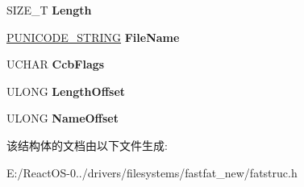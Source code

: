 \begin{DoxyCompactItemize}
S\+I\+Z\+E\+\_\+T {\bfseries Length}
\item 
\mbox{\label{struct___f_a_t___e_n_u_m___d_i_r_e_n_t___c_o_n_t_e_x_t_a7e00d42600eb7bd3980607776e92b93c}} 
\hyperlink{struct___u_n_i_c_o_d_e___s_t_r_i_n_g}{P\+U\+N\+I\+C\+O\+D\+E\+\_\+\+S\+T\+R\+I\+NG} {\bfseries File\+Name}
\item 
\mbox{\label{struct___f_a_t___e_n_u_m___d_i_r_e_n_t___c_o_n_t_e_x_t_afdafb66ea8cc7d9ed8551ca1c5129bb9}} 
U\+C\+H\+AR {\bfseries Ccb\+Flags}
\item 
\mbox{\label{struct___f_a_t___e_n_u_m___d_i_r_e_n_t___c_o_n_t_e_x_t_a9dad6f75731527ab47b0d7359a76199e}} 
U\+L\+O\+NG {\bfseries Length\+Offset}
\item 
\mbox{\label{struct___f_a_t___e_n_u_m___d_i_r_e_n_t___c_o_n_t_e_x_t_aa88beb10c8fe15498cbac51c897e7fb7}} 
U\+L\+O\+NG {\bfseries Name\+Offset}
\end{DoxyCompactItemize}


该结构体的文档由以下文件生成\+:\begin{DoxyCompactItemize}
\item 
E\+:/\+React\+O\+S-\/0../drivers/filesystems/fastfat\+\_\+new/fatstruc.\+h\end{DoxyCompactItemize}
